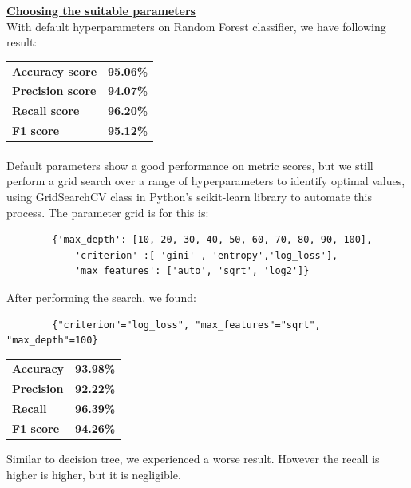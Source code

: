 \documentclass[a4paper]{report}
\begin{document}
	\underline{\textbf{\large Choosing the suitable parameters}}\\[0.5cm]
	With default hyperparameters on Random Forest classifier, we have following result:
	
	\begin{center}
		\begin{tabular}{ll}
			\toprule
			\textbf{Accuracy score} & \textbf{95.06\%} \\
			\textbf{Precision score}  & \textbf{94.07\%} \\
			\textbf{Recall score}     & \textbf{96.20\%} \\
			\textbf{F1 score}   & \textbf{95.12\%} \\
			\bottomrule
		\end{tabular}
	\end{center}
	
	\paragraph{}
	Default parameters show a good performance on metric scores, but we still perform a grid search over a range of hyperparameters to identify optimal values, using GridSearchCV class in Python's scikit-learn library to automate this process. The parameter grid is for this is:
	\begin{verbatim}
		{'max_depth': [10, 20, 30, 40, 50, 60, 70, 80, 90, 100],
			'criterion' :[ 'gini' , 'entropy','log_loss'],
			'max_features': ['auto', 'sqrt', 'log2']} 
	\end{verbatim}
	
	After performing the search, we found:
	\begin{verbatim}
		{"criterion"="log_loss", "max_features"="sqrt", "max_depth"=100}
	\end{verbatim} 
	
	\begin{center}
		\begin{tabular}{ll}
			\toprule
			\textbf{Accuracy} & \textbf{93.98\%} \\
			\textbf{Precision}  & \textbf{92.22\%} \\
			\textbf{Recall}     & \textbf{96.39\%} \\
			\textbf{F1 score}   & \textbf{94.26\%} \\
			\bottomrule
		\end{tabular}
	\end{center}
	
	Similar to decision tree, we experienced a worse result. However the recall is higher is higher, but it is negligible. 
	
\end{document}
